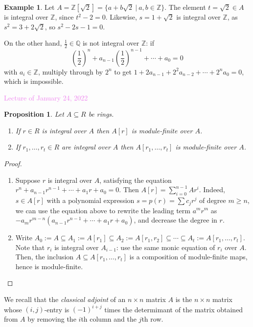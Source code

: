 \documentclass{amsart}[12pt]
\newcommand{\Jan}[1]{\textcolor{violet}{Lecture of January #1, 2022}}
\newcommand{\Q}{\mathbb{Q}}
\newcommand{\Z}{\mathbb{Z}}
\newcommand{\DEF}[1]{\emph{#1}\index{#1}}
\numberwithin{equation}{section}
\theoremstyle{plain} %
\newtheorem{proposition}[equation]{Proposition}
\theoremstyle{definition}
\newtheorem{ex}[equation]{Example}
\theoremstyle{remark}
\begin{document}
\begin{ex} Let  $A= \Z[\sqrt{2}]= \{ a +b \sqrt{2} \ | \ a,b\in \Z\}$. The element $t=\sqrt{2} \in A$ is integral over $\Z$, since $t^2-2=0$. Likewise, $s=1+\sqrt{2}$ is integral over $\Z$, as $s^2=3+2\sqrt{2}$, so $s^2-2s-1=0$. 

On the other hand, $\frac{1}{2} \in \Q$ is not integral over $\Z$: if
\[ \left(\frac{1}{2}\right)^n + a_{n-1} \left(\frac{1}{2}\right)^{n-1} + \cdots + a_0 =0\]
with $a_i\in \Z$, multiply through by $2^n$ to get $1+ 2 a_{n-1} + 2^2 a_{n-2} + \cdots + 2^n a_0=0$, which is impossible.
\end{ex}




\Jan{24}

\begin{proposition}
\label{fg-by-intl-modfin}
	Let $A\subseteq R$ be rings. 
	\begin{enumerate}
		\item If $r\in R$ is integral over $A$ then $A[r]$ is module-finite over $A$.
		\item If $r_1,\dots,r_t \in R$ are integral over $A$ then $A[r_1,\dots,r_t]$ is module-finite over $A$.
	\end{enumerate}
\end{proposition}
\begin{proof}
	\begin{enumerate}
		\item Suppose $r$ is integral over $A$, satisfying the equation $ r^n + a_{n-1} r^{n-1} + \cdots + a_1 r + a_0 = 0$. Then $A[r] = \sum_{i=0}^{n-1} A r^i$. Indeed, $s\in A[r]$ with a polynomial expression $s=p(r)=\sum c_j r^j$ of degree $m \geq n$, we can use the equation above to rewrite the leading term $a^m r^m$ as $-a_m r^{m-n}(a_{n-1} r^{n-1} + \cdots + a_1 r + a_0)$, and decrease the degree in $r$.
		\item 	Write $A_0:=A \subseteq A_1:=A[r_1] \subseteq A_2:=A[r_1,r_2] \subseteq \cdots \subseteq A_t:=A[r_1,\dots,r_t]$. Note that $r_i$ is integral over $A_{i-1}$: use the same monic equation of $r_i$ over $A$. Then, the inclusion $A \subseteq A[r_1,\dots,r_t]$ is a composition of module-finite maps, hence is module-finite.\qedhere
	\end{enumerate}	
\end{proof}

We recall that the \DEF{classical adjoint} of an $n\times n$ matrix $A$ is the $n \times n$ matrix whose $(i,j)$-entry is $(-1)^{i+j}$ times the determimant of the matrix obtained from $A$ by removing the $i$th column and the $j$th row.
\end{document}
